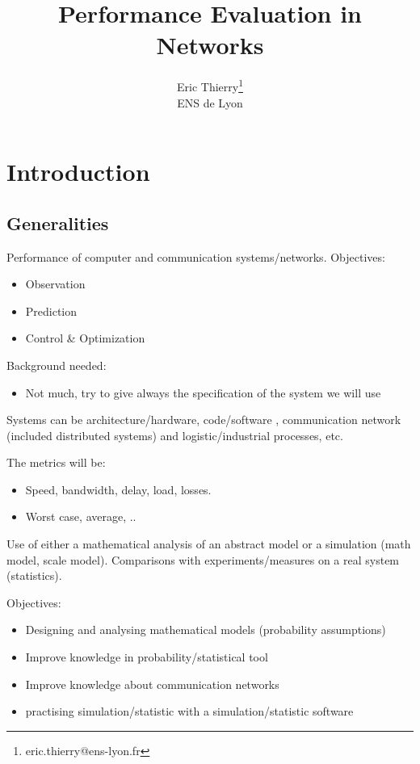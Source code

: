 \documentclass{article}
\title{Performance Evaluation in Networks}
\author{Eric Thierry\footnote{eric.thierry@ens-lyon.fr}\\
\small ENS de Lyon}
\date{}
\begin{document}
\maketitle

\tableofcontents
\newpage


\section{Introduction}
\subsection{Generalities}

Performance of computer and communication systems/networks. Objectives:
\begin{itemize}
\item Observation
\item Prediction
\item Control \& Optimization
\end{itemize}

Background needed:
\begin{itemize}
\item Not much, try to give always the specification of the system we will use
\end{itemize}

Systems can be architecture/hardware, code/software
, communication network (included distributed systems) and logistic/industrial processes, etc.


\bigskip
The metrics will be:
\begin{itemize}
\item Speed, bandwidth, delay, load, losses.
\item Worst case, average, ..
\end{itemize}


\bigskip
Use of either a mathematical analysis of an abstract model or a simulation (math model, scale model). Comparisons with experiments/measures on a real system (statistics).


\bigskip
Objectives:
\begin{itemize}
\item Designing and analysing mathematical models (probability assumptions)
\item Improve knowledge in probability/statistical tool
\item Improve knowledge about communication networks
\item practising simulation/statistic with a simulation/statistic software
\end{itemize}
\end{document}
